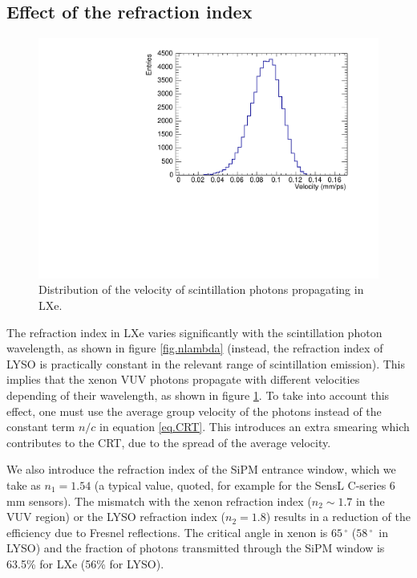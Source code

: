 \documentclass[11pt,a4paper]{article}
\begin{document}
\subsection*{Effect of the refraction index}
\begin{figure}[!bhtp]
	\centering
	\includegraphics[scale=0.6]{img/VelocityDistrLXe.pdf}
	\caption{\label{fig.vLXe} Distribution of the velocity of scintillation photons propagating in LXe.}
\end{figure}

The refraction index in LXe varies significantly with the scintillation photon wavelength, as shown in figure  \ref{fig.nlambda} (instead, the refraction index of LYSO is practically constant in the relevant range of scintillation
emission). This implies that the xenon VUV photons propagate with different velocities depending of their wavelength, as shown in figure \ref{fig.vLXe}. To take into account this effect, one must use the average group velocity of the photons instead of the constant term $n/c$
in equation \ref{eq.CRT}. This introduces an extra smearing which contributes to the CRT, due to the spread of the average velocity. 

We also introduce the refraction index of the SiPM entrance window, which we take as $n_1 = 1.54$ (a typical value, quoted, for example for the SensL C-series 6 mm sensors). The mismatch with the xenon refraction index
($n_2 \sim 1.7$ in the VUV region) or the LYSO refraction index ($n_2 = 1.8$) results in a reduction of the efficiency due to Fresnel reflections. The critical angle in xenon is $65\,^{\circ}$ ($58\,^{\circ}$~in LYSO) and the fraction of photons transmitted through the SiPM window is 63.5\% for LXe (56\% for LYSO).  
\end{document}
